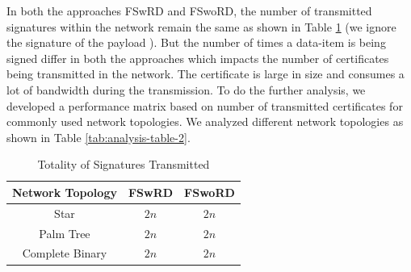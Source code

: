 		In both the approaches FSwRD and FSwoRD, the number of transmitted signatures within the network remain the same as shown in Table \ref{tab:analysis-table-1} (we ignore the signature of the payload ). 
		But the number of times a data-item is being signed differ in both the approaches which impacts the number of certificates being transmitted in the network.
		The certificate is large in size and consumes a lot of bandwidth during the transmission.
		To do the further analysis, we developed a performance matrix based on number of transmitted certificates for commonly used network topologies.
		We analyzed different network topologies as shown in Table \ref{tab:analysis-table-2}. 
		\begin{table}[!htb]
			\begin{center}
				\caption{Totality of Signatures Transmitted}
				\label{tab:analysis-table-1}
				\begin{tabular}{|c||c|c|}
					\hline
					Network Topology & FSwRD & FSwoRD \\ 
					\hline
					\hline
					Star & $2n$ & $2n$ \\
					\hline
					Palm Tree & $2n$ & $2n$\\
					\hline
					Complete Binary & $2n$ & $2n$\\
					\hline
				\end{tabular}
			\end{center}
		\end{table}

